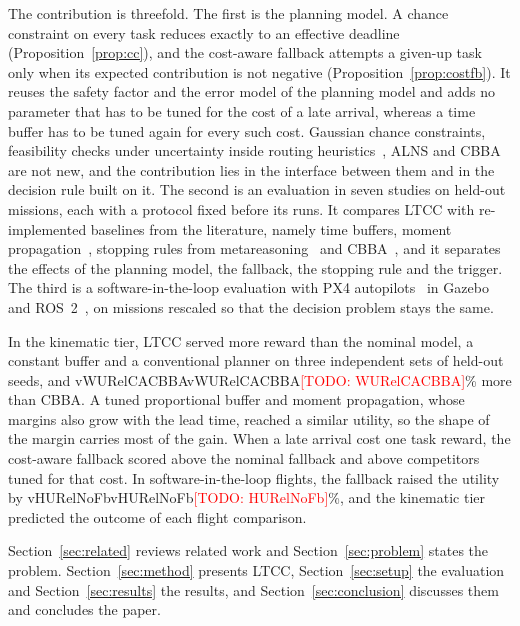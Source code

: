 \documentclass[a4paper,fleqn]{cas-dc}
\newcommand{\todo}[1]{\textcolor{red}{[TODO: #1]}}
\newcommand{\mname}{LTCC}  %
\newcommand{\val}[1]{\ifcsname v#1\endcsname\csname v#1\endcsname\else\todo{#1}\fi}
\newcounter{prop}
\begin{document}
The contribution is threefold. The first is the planning model. A chance constraint on every task reduces exactly to an
effective deadline (Proposition~\ref{prop:cc}), and the cost-aware fallback attempts a given-up task only when its
expected contribution is not negative (Proposition~\ref{prop:costfb}). It reuses the safety factor and the error model
of the planning model and adds no parameter that has to be tuned for the cost of a late arrival, whereas a time buffer
has to be tuned again for every such cost. Gaussian chance
constraints, feasibility checks under uncertainty inside routing
heuristics~\cite{ehmke2015ensuring,bomboi2022stochastic}, ALNS and CBBA are not new, and the contribution lies in the
interface between them and in the decision rule built on it. The second is an evaluation in seven studies on held-out missions, each with a protocol fixed before
its runs. It compares \mname{} with re-implemented baselines from the literature, namely time buffers, moment
propagation~\cite{ehmke2015ensuring}, stopping rules from
metareasoning~\cite{boddy1994deliberation,zilberstein1996using,svegliato2018meta} and CBBA~\cite{choi2009consensus}, and
it separates the effects of the planning model, the fallback, the stopping rule and the trigger. The third is a
software-in-the-loop evaluation with PX4 autopilots~\cite{meier2015px4} in Gazebo~\cite{koenig2004gazebo} and
ROS~2~\cite{macenski2022ros2}, on missions rescaled so that the decision problem stays the same.

In the kinematic tier, \mname{} served more reward than the nominal model, a constant buffer and a conventional planner
on three independent sets of held-out seeds, and \val{WURelCACBBA}\% more than CBBA. A tuned proportional buffer and
moment propagation, whose margins also grow with the lead time, reached a similar utility, so the shape of the margin
carries most of the gain. When a late arrival cost one task reward, the cost-aware fallback scored above the nominal
fallback and above competitors tuned for that cost. In software-in-the-loop flights, the fallback raised the utility by
\val{HURelNoFb}\%, and the kinematic tier predicted the outcome of each flight comparison.

Section~\ref{sec:related} reviews related work and Section~\ref{sec:problem} states the problem.
Section~\ref{sec:method} presents \mname{}, Section~\ref{sec:setup} the evaluation and Section~\ref{sec:results} the
results, and Section~\ref{sec:conclusion} discusses them and concludes the paper.

\end{document}
